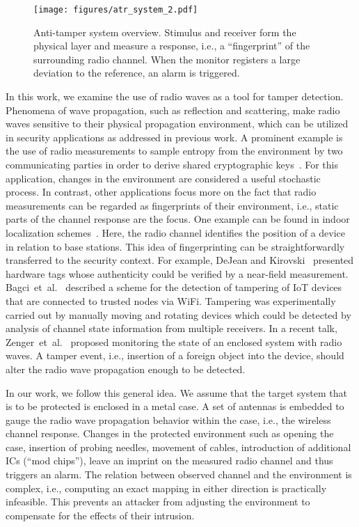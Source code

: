 \documentclass[conference]{IEEEtran}
\makeatletter
\newcommand{\etal}{et~al.\@\xspace}
\makeatother
\begin{document}
\begin{figure}
\centering
\texttt{[image: figures/atr\_system\_2.pdf]}
\caption{Anti-tamper system overview. Stimulus and receiver form the physical layer and measure a response, i.e., a ``fingerprint'' of the surrounding radio channel. When the monitor registers a large deviation to the reference, an alarm is triggered.}
\label{fig:system_overview}
\end{figure}

In this work, we examine the use of radio waves as a tool for tamper detection. Phenomena of wave propagation, such as reflection and scattering, make radio waves sensitive to their physical propagation environment, which can be utilized in security applications as addressed in previous work. A prominent example is the use of radio measurements to sample entropy from the environment by two communicating parties in order to derive shared cryptographic keys~\cite{zhang_key_2016}. For this application, changes in the environment are considered a useful stochastic process. In contrast, other applications focus more on the fact that radio measurements can be regarded as fingerprints of their environment, i.e., static parts of the channel response are the focus. One example can be found in indoor localization schemes~\cite{chenWifiIndoorLocalization}. Here, the radio channel identifies the position of a device in relation to base stations. This idea of fingerprinting can be straightforwardly transferred to the security context. For example, DeJean and Kirovski~\cite{dejeanRFDNARadioFrequencyCertificates2007} presented hardware tags whose authenticity could be verified by a near-field measurement. Bagci~\etal~\cite{bagciUsingChannelState2015} described a scheme for the detection of tampering of IoT devices that are connected to trusted nodes via WiFi. Tampering was experimentally carried out by manually moving and rotating devices which could be detected by analysis of channel state information from multiple receivers. In a recent talk, Zenger~\etal~\cite{enc_puf_36c3} proposed monitoring the state of an enclosed system with radio waves. A tamper event, i.e., insertion of a foreign object into the device, should alter the radio wave propagation enough to be detected.

In our work, we follow this general idea. We assume that the target system that is to be protected is enclosed in a metal case. A set of antennas is embedded to gauge the radio wave propagation behavior within the case, i.e., the wireless channel response. Changes in the protected environment such as opening the case, insertion of probing needles, movement of cables, introduction of additional ICs (``mod chips''), leave an imprint on the measured radio channel and thus triggers an alarm. The relation between observed channel and the environment is complex, i.e., computing an exact mapping in either direction is practically infeasible. This prevents an attacker from adjusting the environment to compensate for the effects of their intrusion.
\end{document}
